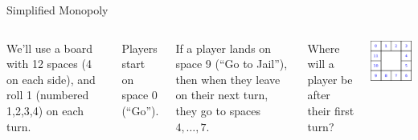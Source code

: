 \documentclass[xcolor=dvipsnames,aspectratio=169,t]{beamer}
\begin{document}
\begin{frame}{Simplified Monopoly}
  \begin{columns}[T]
  \medskip
  
  We'll use a board with 12 spaces (4 on each side),
  and roll 1  (numbered 1,2,3,4) on each turn.
  \medskip
  
  Players start on space 0 (``Go'').
  \medskip

  If a player lands on space 9 (``Go to Jail''), then when they leave on their next turn, they go to spaces $4,\ldots,7$.
  \bigskip
  
  Where will a player be after their \alert{first turn}?
  \medskip
  
  
  \bigskip
  
  \hspace*{1em}\includegraphics[scale=1.25]{images/Simplified_Monopoly_Board.pdf}
  \end{columns}

\end{frame}
\end{document}
